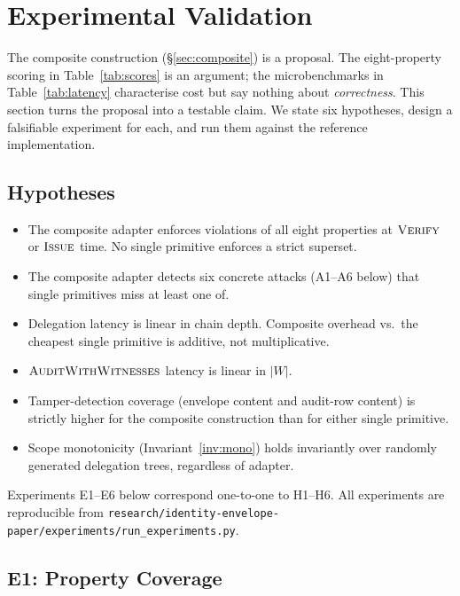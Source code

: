 \documentclass[11pt,a4paper]{article}
\begin{document}
\section{Experimental Validation}\label{sec:validation}

The composite construction (\S\ref{sec:composite}) is a proposal. The
eight-property scoring in Table~\ref{tab:scores} is an argument; the
microbenchmarks in Table~\ref{tab:latency} characterise cost but say
nothing about \emph{correctness}. This section turns the proposal into a
testable claim. We state six hypotheses, design a falsifiable
experiment for each, and run them against the reference implementation.

\subsection{Hypotheses}\label{sec:hypotheses}

\begin{itemize}[leftmargin=*,nosep]
  \item[\textbf{H1.}] The composite adapter enforces violations of all
    eight properties at $\textsc{Verify}$ or $\textsc{Issue}$ time. No
    single primitive enforces a strict superset.
  \item[\textbf{H2.}] The composite adapter detects six concrete attacks
    (A1--A6 below) that single primitives miss at least one of.
  \item[\textbf{H3.}] Delegation latency is linear in chain depth.
    Composite overhead vs.\ the cheapest single primitive is additive,
    not multiplicative.
  \item[\textbf{H4.}] $\textsc{AuditWithWitnesses}$ latency is linear
    in $|W|$.
  \item[\textbf{H5.}] Tamper-detection coverage (envelope content and
    audit-row content) is strictly higher for the composite construction
    than for either single primitive.
  \item[\textbf{H6.}] Scope monotonicity (Invariant~\ref{inv:mono}) holds
    invariantly over randomly generated delegation trees, regardless of
    adapter.
\end{itemize}

Experiments E1--E6 below correspond one-to-one to H1--H6. All
experiments are reproducible from
\texttt{research/identity-envelope-paper/experiments/run\_experiments.py}.

\subsection{E1: Property Coverage}\label{sec:e1}
\end{document}
